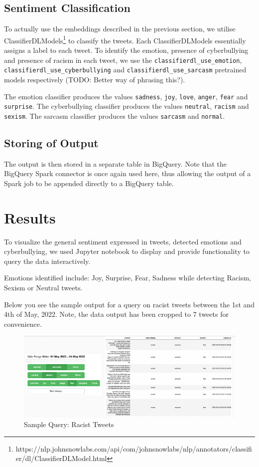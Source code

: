 \documentclass[a4paper,12pt]{article}
\begin{document}
\subsection{Sentiment Classification}
To actually use the embeddings described in the previous section, we utilise ClassifierDLModels\footnote{https://nlp.johnsnowlabs.com/api/com/johnsnowlabs/nlp/annotators/classifier/dl/ClassifierDLModel.html} to classify the tweets. Each ClassifierDLModels essentially assigns a label to each tweet. To identify the emotion, presence of cyberbullying and presence of racism in each tweet, we use the \texttt{classifierdl\_use\_emotion}, \texttt{classifierdl\_use\_cyberbullying} and \texttt{classifierdl\_use\_sarcasm} pretrained models respectively ({\color{red}TODO: Better way of phrasing this?}). 

The emotion classifier produces the values \texttt{sadness}, \texttt{joy}, \texttt{love}, \texttt{anger}, \texttt{fear} and \texttt{surprise}. The cyberbullying classifier produces the values \texttt{neutral}, \texttt{racism} and \texttt{sexism}. The sarcasm classifier produces the values \texttt{sarcasm} and \texttt{normal}. 

\subsection{Storing of Output}
The output is then stored in a separate table in BigQuery. Note that the BigQuery Spark connector is once again used here, thus allowing the output of a Spark job to be appended directly to a BigQuery table.

\section{Results}

To visualize the general sentiment expressed in tweets, detected emotions and cyberbullying, we used Jupyter notebook to
display and provide functionality to query the data interactively.

Emotions identified include: Joy, Surprise, Fear, Sadness while detecting Racism, Sexism or Neutral tweets.

Below you see the sample output for a query on racist tweets between the 1st and 4th of May, 2022. Note, the data output
has been cropped to 7 tweets for convenience.

\begin{figure}[h]
	\centering
	\includegraphics[width=\textwidth]{racism.png}
	\caption{Sample Query: Racist Tweets}
	\label{fig:Racist-Tweet-Query}
\end{figure}
\end{document}
